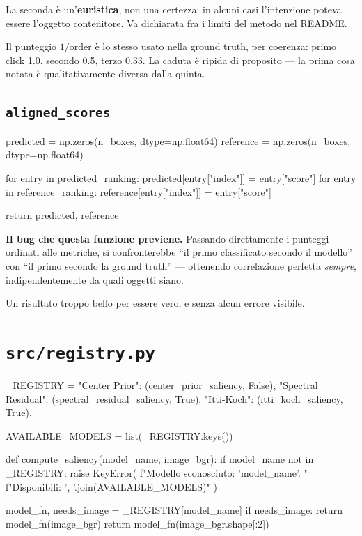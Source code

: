 \begin{attenzione}
La seconda è un'\textbf{euristica}, non una certezza: in alcuni casi l'intenzione poteva essere
l'oggetto contenitore. Va dichiarata fra i limiti del metodo nel README.
\end{attenzione}

Il punteggio $1/\text{order}$ è lo stesso usato nella ground truth, per coerenza: primo click
1.0, secondo 0.5, terzo 0.33. La caduta è ripida di proposito --- la prima cosa notata è
qualitativamente diversa dalla quinta.

\subsection{\texttt{aligned\_scores}}

\begin{idebox}
\begin{pycode}
predicted = np.zeros(n_boxes, dtype=np.float64)
reference = np.zeros(n_boxes, dtype=np.float64)

for entry in predicted_ranking:
    predicted[entry["index"]] = entry["score"]
for entry in reference_ranking:
    reference[entry["index"]] = entry["score"]

return predicted, reference
\end{pycode}
\end{idebox}

\begin{attenzione}
\textbf{Il bug che questa funzione previene.} Passando direttamente i punteggi ordinati alle
metriche, si confronterebbe ``il primo classificato secondo il modello'' con ``il primo secondo
la ground truth'' --- ottenendo correlazione perfetta \emph{sempre}, indipendentemente da quali
oggetti siano.

\medskip
Un risultato troppo bello per essere vero, e senza alcun errore visibile.
\end{attenzione}

\section{\texttt{src/registry.py}}

\begin{idebox}
\begin{pycode}
_REGISTRY = {
    "Center Prior": (center_prior_saliency, False),
    "Spectral Residual": (spectral_residual_saliency, True),
    "Itti-Koch": (itti_koch_saliency, True),
}

AVAILABLE_MODELS = list(_REGISTRY.keys())


def compute_saliency(model_name, image_bgr):
    if model_name not in _REGISTRY:
        raise KeyError(
            f"Modello sconosciuto: '{model_name}'. "
            f"Disponibili: {', '.join(AVAILABLE_MODELS)}"
        )

    model_fn, needs_image = _REGISTRY[model_name]
    if needs_image:
        return model_fn(image_bgr)
    return model_fn(image_bgr.shape[:2])
\end{pycode}
\end{idebox}

